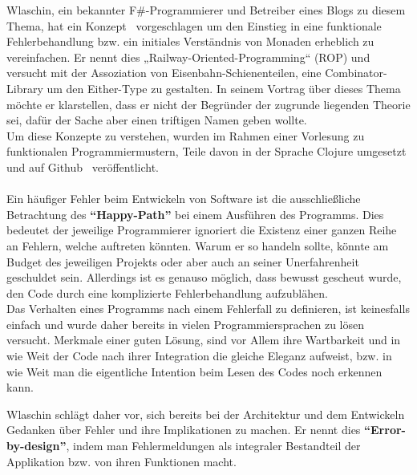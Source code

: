 \documentclass[10pt,journal,compsoc]{IEEEtran}
\begin{document}
   Wlaschin, ein bekannter F\#-Programmierer und Betreiber eines Blogs zu diesem Thema, hat ein Konzept~\cite{railwayWlaschin} vorgeschlagen um den Einstieg in eine funktionale Fehlerbehandlung bzw. ein initiales Verständnis von Monaden erheblich zu vereinfachen.
  Er nennt dies „Railway-Oriented-Programming“ (ROP) und versucht mit der Assoziation von Eisenbahn-Schienenteilen, eine Combinator-Library um den Either-Type zu gestalten.
  In seinem Vortrag über dieses Thema~\cite{railwayWlaschinNdc} möchte er klarstellen, dass er nicht der Begründer der zugrunde liegenden Theorie sei, dafür der Sache aber einen triftigen Namen geben wollte.\\
  Um diese Konzepte zu verstehen, wurden im Rahmen einer Vorlesung zu funktionalen Programmiermustern, Teile davon in der Sprache Clojure umgesetzt und auf Github~\cite{ropclojure} veröffentlicht.\\\\
  Ein häufiger Fehler beim Entwickeln von Software ist die ausschließliche Betrachtung des \textbf{"`Happy-Path"'} bei einem Ausführen des Programms.
  Dies bedeutet der jeweilige Programmierer ignoriert die Existenz einer ganzen Reihe an Fehlern, welche auftreten könnten.
  Warum er so handeln sollte, könnte am Budget des jeweiligen Projekts oder aber auch an seiner Unerfahrenheit geschuldet sein.
  Allerdings ist es genauso möglich, dass bewusst gescheut wurde, den Code durch eine komplizierte Fehlerbehandlung aufzublähen.\\
  Das Verhalten eines Programms nach einem Fehlerfall zu definieren, ist keinesfalls einfach und wurde daher bereits in vielen Programmiersprachen zu lösen versucht.
  Merkmale einer guten Lösung, sind vor Allem ihre Wartbarkeit und in wie Weit der Code nach ihrer Integration die gleiche Eleganz aufweist, bzw. in wie Weit man die eigentliche Intention beim Lesen des Codes noch erkennen kann.

  Wlaschin schlägt daher vor, sich bereits bei der Architektur und dem Entwickeln Gedanken über Fehler und ihre Implikationen zu machen. Er nennt dies \textbf{"`Error-by-design"'}, indem man Fehlermeldungen als integraler Bestandteil der Applikation bzw. von ihren Funktionen macht.
\end{document}
